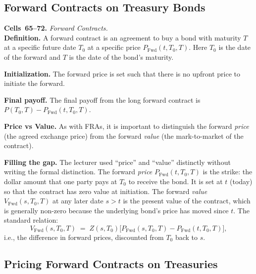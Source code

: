 \subsection{Forward Contracts on Treasury Bonds}\label{L1-sec:fwd-contract}

\begin{keyblock}
\textbf{Cells~65--72.} \emph{Forward Contracts.}\\
\textbf{Definition.} A forward contract is an agreement to buy a bond with
maturity $T$ at a specific future date $T_0$ at a specific price
$P_{\text{Fwd}}(t,T_0,T)$. Here $T_0$ is the date of the forward and $T$ is
the date of the bond's maturity.

\textbf{Initialization.} The forward price is set such that there is no
upfront price to initiate the forward.

\textbf{Final payoff.} The final payoff from the long forward contract is
$P(T_0, T) - P_{\text{Fwd}}(t,T_0,T)$.

\textbf{Price vs Value.} As with FRAs, it is important to distinguish the
forward \emph{price} (the agreed exchange price) from the forward
\emph{value} (the mark-to-market of the contract).
\end{keyblock}

\begin{tipblock}
\textbf{Filling the gap.} The lecturer used ``price'' and ``value''
distinctly without writing the formal distinction. The forward \emph{price}
$P_{\text{Fwd}}(t,T_0,T)$ is the strike: the dollar amount that one party
pays at $T_0$ to receive the bond. It is set at $t$ (today) so that the
contract has zero value at initiation. The forward \emph{value}
$V_{\text{Fwd}}(s,T_0,T)$ at any later date $s>t$ is the present value of the
contract, which is generally non-zero because the underlying bond's price has
moved since $t$. The standard relation:
\[
    V_{\text{Fwd}}(s,T_0,T) \;=\;
       Z(s,T_0)\bigl[P_{\text{Fwd}}(s,T_0,T) - P_{\text{Fwd}}(t,T_0,T)\bigr],
\]
i.e., the difference in forward prices, discounted from $T_0$ back to $s$.
\end{tipblock}

\subsection{Pricing Forward Contracts on Treasuries}\label{L1-sec:fwd-treas}

